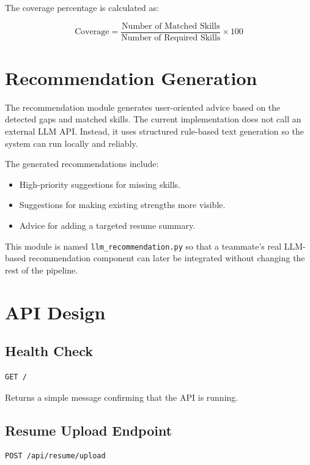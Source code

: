\documentclass[12pt,a4paper]{article}
\begin{document}
The coverage percentage is calculated as:

\[
\text{Coverage} = \frac{\text{Number of Matched Skills}}{\text{Number of Required Skills}} \times 100
\]

\section{Recommendation Generation}

The recommendation module generates user-oriented advice based on the detected gaps and matched skills. The current implementation does not call an external LLM API. Instead, it uses structured rule-based text generation so the system can run locally and reliably.

The generated recommendations include:

\begin{itemize}
    \item High-priority suggestions for missing skills.
    \item Suggestions for making existing strengths more visible.
    \item Advice for adding a targeted resume summary.
\end{itemize}

This module is named \texttt{llm\_recommendation.py} so that a teammate's real LLM-based recommendation component can later be integrated without changing the rest of the pipeline.

\section{API Design}

\subsection{Health Check}

\begin{lstlisting}
GET /
\end{lstlisting}

Returns a simple message confirming that the API is running.

\subsection{Resume Upload Endpoint}

\begin{lstlisting}
POST /api/resume/upload
\end{lstlisting}
\end{document}
